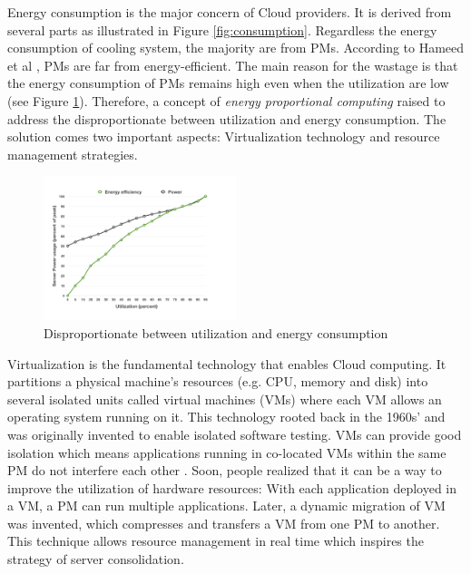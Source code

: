 Energy consumption \cite{Kaplan:up01fR-k} is the major concern of Cloud providers. It is derived from several parts as illustrated in Figure \ref{fig:consumption}. 
Regardless the energy consumption of cooling system, 
the majority are from PMs.
According to Hameed et al \cite{Hameed:2016cma}, PMs are far from energy-efficient. 
The main reason for the wastage is that the energy consumption of PMs remains high even when the utilization are low (see Figure \ref{fig:unproportional}). 
Therefore, a concept of \emph{energy proportional computing} \cite{Barroso:2007jt} raised to address the disproportionate between utilization and energy consumption. 
The solution comes two important aspects:  Virtualization technology and resource management strategies. 



\begin{figure}[H]
	\centering
	\includegraphics[width=0.5\textwidth]{pics/util.png}
	\caption{Disproportionate between utilization and energy consumption \cite{Barroso:2007jt}}
	\label{fig:unproportional}
\end{figure} 


Virtualization \cite{Uhlig:2005do} is the fundamental technology that enables Cloud computing. It partitions a physical machine's resources (e.g. CPU, memory and disk) into several isolated units called virtual machines (VMs) where each VM allows an operating system running on it. This technology rooted back in the 1960s' and was originally invented to enable isolated software testing. VMs can provide good isolation which means applications running in co-located VMs within the same PM do not interfere each other \cite{Somani:2009ho}.  Soon, people realized that it can be a way to improve the utilization of hardware resources: With each application deployed in a VM, a PM can run multiple applications. Later, a dynamic migration of VM was invented, which compresses and transfers a VM from one PM to another. This technique allows resource management in real time which inspires the strategy of server consolidation. 


